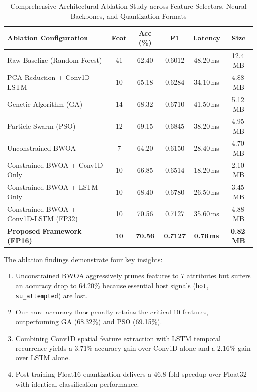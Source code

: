 \documentclass[conference]{IEEEtran}
\begin{document}
\begin{table}[htbp]
\caption{Comprehensive Architectural Ablation Study across Feature Selectors, Neural Backbones, and Quantization Formats}
\label{tab:ablation}
\centering
\begin{tabularx}{\columnwidth}{lccccc}
\toprule
\textbf{Ablation Configuration} & \textbf{Feat} & \textbf{Acc (\%)} & \textbf{F1} & \textbf{Latency} & \textbf{Size} \\
\midrule
Raw Baseline (Random Forest) & 41 & 62.40 & 0.6012 & 48.20\,ms & 12.4\,MB \\
PCA Reduction + Conv1D-LSTM & 10 & 65.18 & 0.6284 & 34.10\,ms & 4.88\,MB \\
Genetic Algorithm (GA) \cite{holland1992adaptation} & 14 & 68.32 & 0.6710 & 41.50\,ms & 5.12\,MB \\
Particle Swarm (PSO) \cite{kennedy1995particle} & 12 & 69.15 & 0.6845 & 38.20\,ms & 4.95\,MB \\
Unconstrained BWOA \cite{ghosh2022bwoa} & 7 & 64.20 & 0.6150 & 28.40\,ms & 4.70\,MB \\
Constrained BWOA + Conv1D Only & 10 & 66.85 & 0.6514 & 18.20\,ms & 2.10\,MB \\
Constrained BWOA + LSTM Only & 10 & 68.40 & 0.6780 & 26.50\,ms & 3.45\,MB \\
Constrained BWOA + Conv1D-LSTM (FP32) & 10 & 70.56 & 0.7127 & 35.60\,ms & 4.88\,MB \\
\textbf{Proposed Framework (FP16)} & \textbf{10} & \textbf{70.56} & \textbf{0.7127} & \textbf{0.76\,ms} & \textbf{0.82\,MB} \\
\bottomrule
\end{tabularx}
\end{table}

The ablation findings demonstrate four key insights:
\begin{enumerate}
    \item Unconstrained BWOA aggressively prunes features to 7 attributes but suffers an accuracy drop to 64.20\% because essential host signals (\texttt{hot}, \texttt{su\_attempted}) are lost.
    \item Our hard accuracy floor penalty retains the critical 10 features, outperforming GA (68.32\%) and PSO (69.15\%).
    \item Combining Conv1D spatial feature extraction with LSTM temporal recurrence yields a 3.71\% accuracy gain over Conv1D alone and a 2.16\% gain over LSTM alone.
    \item Post-training Float16 quantization delivers a 46.8-fold speedup over Float32 with identical classification performance.
\end{enumerate}
\end{document}
